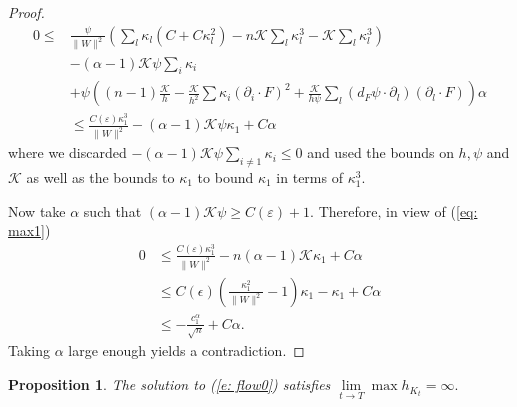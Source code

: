 \documentclass{amsart}
\newtheorem{proposition}[theorem]{Proposition}
\theoremstyle{definition}
\theoremstyle{remark}
\newtheorem{remark}[theorem]{Remark}
\numberwithin{equation}{section}
\begin{document}
\begin{proof}
\begin{align*}
0 \leq& \frac{\psi}{\|W\|^2}\left(\sum_l \kappa_l(C + C \kappa_l^2) - n \mathcal{K} \sum_l \kappa_l^3 - \mathcal{K} \sum_l \kappa_l^3\right) \\
&- (\alpha-1) \mathcal{K} \psi \sum_i \kappa_i \\
& + \psi \left((n-1)\frac{\mathcal{K}}{h} - \frac{\mathcal{K}}{h^2} \sum \kappa_i (\partial_i \cdot F)^2 + \frac{\mathcal{K}}{h\psi} \sum_l  (d_F \psi \cdot \partial_l) (\partial_l \cdot F) \right) \alpha \\
&\leq \frac{C(\varepsilon)\kappa_1^3}{\|W\|^2} - (\alpha-1) \mathcal{K}\psi \kappa_1 + C \alpha
\end{align*}
where we discarded $-(\alpha-1)\mathcal{K}\psi \sum_{i\neq 1} \kappa_i \leq 0$ and used the bounds on $h, \psi$ and $\mathcal{K}$ as well as the bounds to $\kappa_1$ to bound $\kappa_1$ in terms of $\kappa_1^3$.

Now take $\alpha$ such that $(\alpha-1) \mathcal{K}\psi \geq C(\varepsilon)+1$. Therefore, in view of (\ref{eq: max1})
\begin{equation}\label{x}
\begin{split}
0 &\leq \frac{C(\varepsilon)\kappa_1^3}{\|W\|^2} - n(\alpha-1) \mathcal{K}\kappa_1 + C\alpha \\
&\leq C(\epsilon)\left(\frac{\kappa_1^2}{\|W\|^2} - 1\right) \kappa_1 - \kappa_1 + C\alpha \\
&\leq -\frac{c_1^{\alpha}}{\sqrt{n}} + C\alpha.
\end{split}
\end{equation}
Taking $\alpha$ large enough yields a contradiction.
\end{proof}
\begin{proposition}\label{prop: expansion to infty}
The solution to (\ref{e: flow0}) satisfies $\lim\limits_{t\to T}\max h_{K_t}=\infty.$
\end{proposition}
\end{document}
